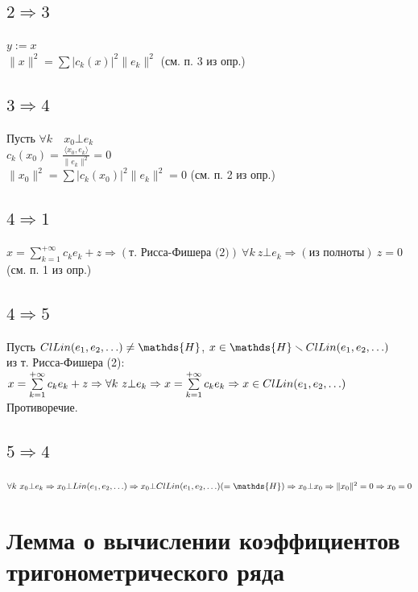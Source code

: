 \documentclass[paper=a4, fontsize=17pt]{article}
\begin{document}
\subsection{\texorpdfstring{$2 \Rightarrow 3$}{TEXT}}
$y:=x$\\
$\|x\|^2=\sum \vert c_k(x) \vert ^2 \|e_k\|^2$ (см. п. 3 из опр.)

\subsection{\texorpdfstring{$3 \Rightarrow 4$}{TEXT}}
Пусть $\forall k \quad x_0 \bot e_k$\\
$c_k(x_0)=\frac{\langle x_0, e_k \rangle}{\|e_k\|^2}=0$\\
$\|x_0\|^2=\sum \vert c_k(x_0) \vert^2 \|e_k\|^2 = 0$ (см. п. 2 из опр.)

\subsection{\texorpdfstring{$4 \Rightarrow 1$}{TEXT}}
$x =\sum\limits_{k=1}^{+\infty} c_k e_k + z \Rightarrow(\text{т. Рисса-Фишера (2)}) \  \forall k \ z \bot e_k \Rightarrow(\text{из полноты}) \ z = 0$ (см. п. 1 из опр.)

\subsection{\texorpdfstring{$4 \Rightarrow 5$}{TEXT}}
Пусть $Cl Lin(e_1, e_2, \mathellipsis) \ne \mathds{H}$, $x \in \mathds{H} \smallsetminus Cl Lin(e_1, e_2, \mathellipsis)$\\
из т. Рисса-Фишера (2): $x =\sum\limits_{k=1}^{+\infty} c_k e_k + z \Rightarrow \forall k \ z \bot e_k \Rightarrow x =\sum\limits_{k=1}^{+\infty} c_k e_k \Rightarrow x \in Cl Lin(e_1, e_2, \mathellipsis)$\\
Противоречие.

\subsection{\texorpdfstring{$5 \Rightarrow 4$}{TEXT}}
$\forall k \ x_0 \bot e_k \Rightarrow x_0 \bot Lin(e_1, e_2, \mathellipsis) \Rightarrow x_0 \bot Cl Lin(e_1, e_2, \mathellipsis)( = \mathds{H}) \Rightarrow x_0 \bot x_0 \Rightarrow \|x_0\|^2 = 0 \Rightarrow x_0 = 0$

\section{Лемма о вычислении коэффициентов тригонометрического ряда}
\end{document}
